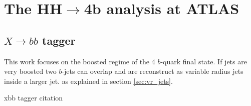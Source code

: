 \chapter{The HH$\rightarrow$4b analysis at ATLAS}





\section{$X\rightarrow bb$ tagger}

This work focuses on the boosted regime of the 4 $b$-quark final state. If jets are very boosted two $b$-jets can overlap and are reconstruct as variable radius jets inside a larger jet. 
as explained in section \ref{sec:vr_jets}.

xbb tagger citation
\citep{ATL-PHYS-PUB-2020-019}
